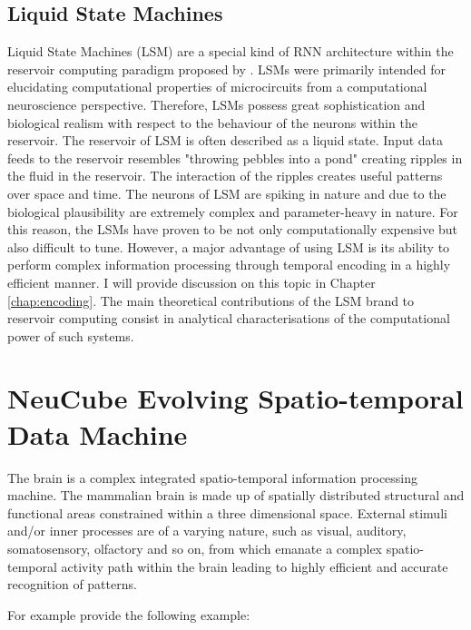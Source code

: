 \subsection{Liquid State Machines}


Liquid State Machines (LSM) are a special kind of RNN architecture within the reservoir computing paradigm proposed by \citet{maass2002real}. LSMs were primarily intended for elucidating computational properties of microcircuits from a computational neuroscience perspective. Therefore, LSMs  possess great sophistication and biological realism  with respect to the behaviour of the neurons within the reservoir. The reservoir of LSM is often described as a liquid state. Input data feeds to the reservoir resembles "throwing pebbles into a pond" creating ripples in the fluid in the reservoir. The interaction of the ripples creates useful patterns over space and time. The neurons of LSM are spiking in nature and due to the biological plausibility are extremely complex and parameter-heavy in nature. For this reason, the LSMs have proven to be not only computationally expensive but also difficult to tune. However, a major advantage of using LSM is its ability to perform complex information processing through temporal encoding in a highly efficient manner. I will provide discussion on this topic in Chapter \ref{chap:encoding}. The main theoretical contributions of the LSM brand to reservoir computing consist in analytical characterisations of the computational power of such systems.  

\section{NeuCube Evolving Spatio-temporal Data Machine}
\label{sec:neucube_estdm}
The brain is a complex integrated spatio-temporal information processing machine. The mammalian brain is made up of spatially distributed structural and functional areas constrained within a three dimensional space. External stimuli and/or inner processes are of a varying nature, such as visual, auditory, somatosensory, olfactory and so on, from which emanate a complex spatio-temporal activity path within the brain leading to highly efficient and accurate recognition of patterns.

For example \citet{benuskova2010computational} provide the following example:

